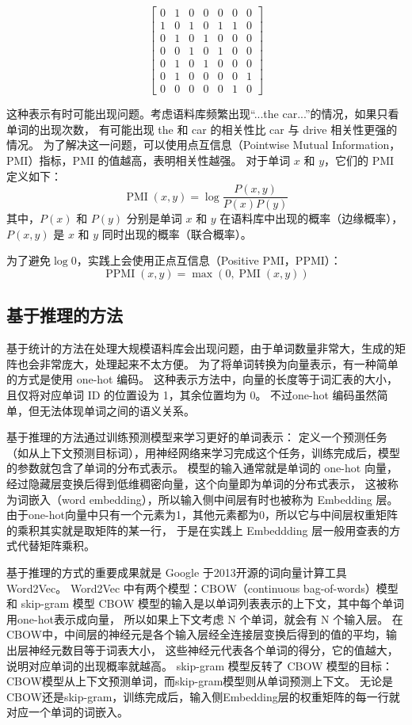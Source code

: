$$
	\begin{bmatrix}
		0 & 1 & 0 & 0 & 0 & 0 & 0 \\
		1 & 0 & 1 & 0 & 1 & 1 & 0 \\
		0 & 1 & 0 & 1 & 0 & 0 & 0 \\
		0 & 0 & 1 & 0 & 1 & 0 & 0 \\
		0 & 1 & 0 & 1 & 0 & 0 & 0 \\
		0 & 1 & 0 & 0 & 0 & 0 & 1 \\
		0 & 0 & 0 & 0 & 0 & 1 & 0
	\end{bmatrix}
$$

这种表示有时可能出现问题。考虑语料库频繁出现“...the car...”的情况，如果只看单词的出现次数，
有可能出现 the 和 car 的相关性比 car 与 drive 相关性更强的情况。
为了解决这一问题，可以使用点互信息（Pointwise Mutual Information，PMI）指标，PMI 的值越高，表明相关性越强。
对于单词 $x$ 和 $y$，它们的 PMI 定义如下：
$$
	\operatorname{PMI}(x, y) = \log \frac{P(x, y)}{P(x) P(y)}
$$
其中，$P(x)$ 和 $P(y)$ 分别是单词 $x$ 和 $y$ 在语料库中出现的概率（边缘概率），$P(x, y)$ 是 $x$ 和 $y$ 同时出现的概率（联合概率）。

为了避免$\log 0$，实践上会使用正点互信息（Positive PMI，PPMI）：
$$
	\operatorname{PPMI}(x, y) = \max(0, \operatorname{PMI}(x, y))
$$

\subsection{基于推理的方法}
基于统计的方法在处理大规模语料库会出现问题，由于单词数量非常大，生成的矩阵也会非常庞大，处理起来不太方便。
为了将单词转换为向量表示，有一种简单的方式是使用 one-hot 编码。
这种表示方法中，向量的长度等于词汇表的大小，且仅将对应单词 ID 的位置设为 1，其余位置均为 0。
不过one-hot 编码虽然简单，但无法体现单词之间的语义关系。

基于推理的方法通过训练预测模型来学习更好的单词表示：
定义一个预测任务（如从上下文预测目标词），用神经网络来学习完成这个任务，训练完成后，模型的参数就包含了单词的分布式表示。
模型的输入通常就是单词的 one-hot 向量，经过隐藏层变换后得到低维稠密向量，这个向量即为单词的分布式表示，
这被称为词嵌入（word embedding），所以输入侧中间层有时也被称为 Embedding 层。
由于one-hot向量中只有一个元素为1，其他元素都为0，所以它与中间层权重矩阵的乘积其实就是取矩阵的某一行，
于是在实践上 Embeddding 层一般用查表的方式代替矩阵乘积。

基于推理的方式的重要成果就是 Google 于2013开源的词向量计算工具 Word2Vec。
Word2Vec 中有两个模型：CBOW（continuous bag-of-words）模型和 skip-gram 模型
CBOW 模型的输入是以单词列表表示的上下文，其中每个单词用one-hot表示成向量，
所以如果上下文考虑 N 个单词，就会有 N 个输入层。
在CBOW中，中间层的神经元是各个输入层经全连接层变换后得到的值的平均，输出层神经元数目等于词表大小，
这些神经元代表各个单词的得分，它的值越大，说明对应单词的出现概率就越高。
skip-gram 模型反转了 CBOW 模型的目标：CBOW模型从上下文预测单词，而skip-gram模型则从单词预测上下文。
无论是CBOW还是skip-gram，训练完成后，输入侧Embedding层的权重矩阵的每一行就对应一个单词的词嵌入。

